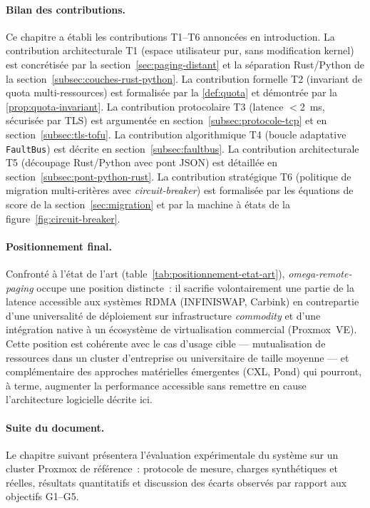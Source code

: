 \paragraph{Bilan des contributions.}
Ce chapitre a établi les contributions T1--T6 annoncées en introduction. La contribution architecturale T1 (espace utilisateur pur, sans modification kernel) est concrétisée par la section~\ref{sec:paging-distant} et la séparation Rust/Python de la section~\ref{subsec:couches-rust-python}. La contribution formelle T2 (invariant de quota multi-ressources) est formalisée par la \autoref{def:quota} et démontrée par la \autoref{prop:quota-invariant}. La contribution protocolaire T3 (latence $<$2~ms, sécurisée par TLS) est argumentée en section~\ref{subsec:protocole-tcp} et en section~\ref{subsec:tls-tofu}. La contribution algorithmique T4 (boucle adaptative \texttt{FaultBus}) est décrite en section~\ref{subsec:faultbus}. La contribution architecturale T5 (découpage Rust/Python avec pont JSON) est détaillée en section~\ref{subsec:pont-python-rust}. La contribution stratégique T6 (politique de migration multi-critères avec \textit{circuit-breaker}) est formalisée par les équations de score de la section~\ref{sec:migration} et par la machine à états de la figure~\ref{fig:circuit-breaker}.

\paragraph{Positionnement final.}
Confronté à l'état de l'art (table~\ref{tab:positionnement-etat-art}), \textit{omega-remote-paging} occupe une position distincte~: il sacrifie volontairement une partie de la latence accessible aux systèmes RDMA (INFINISWAP, Carbink) en contrepartie d'une universalité de déploiement sur infrastructure \textit{commodity} et d'une intégration native à un écosystème de virtualisation commercial (Proxmox~VE). Cette position est cohérente avec le cas d'usage cible --- mutualisation de ressources dans un cluster d'entreprise ou universitaire de taille moyenne --- et complémentaire des approches matérielles émergentes (CXL, Pond) qui pourront, à terme, augmenter la performance accessible sans remettre en cause l'architecture logicielle décrite ici.

\paragraph{Suite du document.}
Le chapitre suivant présentera l'évaluation expérimentale du système sur un cluster Proxmox de référence~: protocole de mesure, charges synthétiques et réelles, résultats quantitatifs et discussion des écarts observés par rapport aux objectifs G1--G5.